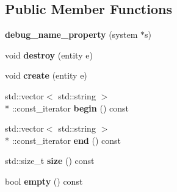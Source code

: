 \subsection*{Public Member Functions}
\begin{DoxyCompactItemize}
\item 
\hypertarget{classopeneda_1_1entity_1_1debug__name__property_a1d7cf626d7f8f0f6766b6b8431dedf21}{{\bfseries debug\-\_\-name\-\_\-property} (system $\ast$s)}\label{classopeneda_1_1entity_1_1debug__name__property_a1d7cf626d7f8f0f6766b6b8431dedf21}

\item 
\hypertarget{classopeneda_1_1entity_1_1debug__name__property_a6c280f9588593afe1f8847802cd190c6}{void {\bfseries destroy} (entity e)}\label{classopeneda_1_1entity_1_1debug__name__property_a6c280f9588593afe1f8847802cd190c6}

\item 
\hypertarget{classopeneda_1_1entity_1_1debug__name__property_ae11394984848614cce362fb3b207dcd8}{void {\bfseries create} (entity e)}\label{classopeneda_1_1entity_1_1debug__name__property_ae11394984848614cce362fb3b207dcd8}

\item 
\hypertarget{classopeneda_1_1entity_1_1debug__name__property_a85e2bb84ff787bb2aef0ad7604508fe0}{std\-::vector$<$ std\-::string $>$\\*
\-::const\-\_\-iterator {\bfseries begin} () const }\label{classopeneda_1_1entity_1_1debug__name__property_a85e2bb84ff787bb2aef0ad7604508fe0}

\item 
\hypertarget{classopeneda_1_1entity_1_1debug__name__property_a5eb22fc683a4800cf98d5c79b574bcd7}{std\-::vector$<$ std\-::string $>$\\*
\-::const\-\_\-iterator {\bfseries end} () const }\label{classopeneda_1_1entity_1_1debug__name__property_a5eb22fc683a4800cf98d5c79b574bcd7}

\item 
\hypertarget{classopeneda_1_1entity_1_1debug__name__property_ab9611108691428a8406e885a93baed1f}{std\-::size\-\_\-t {\bfseries size} () const }\label{classopeneda_1_1entity_1_1debug__name__property_ab9611108691428a8406e885a93baed1f}

\item 
\hypertarget{classopeneda_1_1entity_1_1debug__name__property_a7088adf2ed7e1db8cc3e3055647082b1}{bool {\bfseries empty} () const }\label{classopeneda_1_1entity_1_1debug__name__property_a7088adf2ed7e1db8cc3e3055647082b1}


\end{DoxyCompactItemize}

